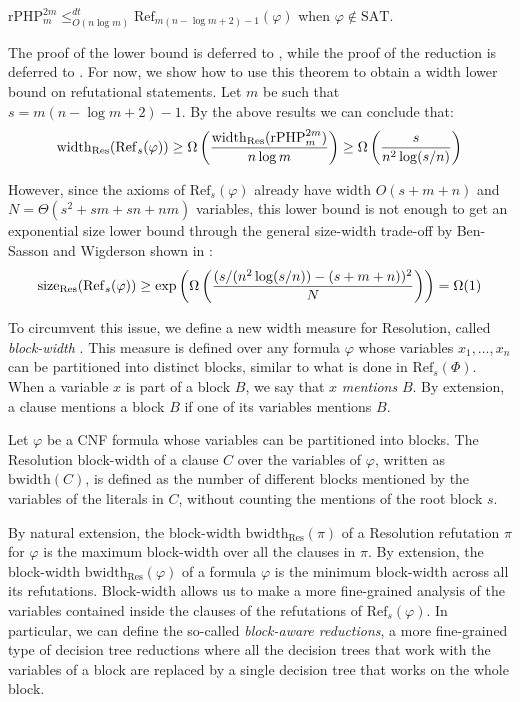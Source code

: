 \begin{theorem}
    \label{thm:rPHP_to_Ref}
    $\mathrm{rPHP}^{2m}_{m} \leq^{dt}_{O(n\log m)} \mathrm{Ref}_{m(n-\log m +2)-1}(\varphi)$ when $\varphi \notin \mathrm{SAT}$.
\end{theorem}

The proof of the lower bound is deferred to , while the proof of the reduction is deferred to . For now, we show how to use this theorem to obtain a width lower bound on refutational statements. Let $m$ be such that $s = m(n-\log m +2)-1$. By the above results we can conclude that:
\begin{equation}
    \mathrm{width}_{\mathrm{Res}}(\mathrm{Ref}_s(\varphi)) \geq \Omega \left ( \dfrac{\mathrm{width}_{\mathrm{Res}}(\mathrm{rPHP}^{2m}_{m})}{n \log m} \right ) \geq \Omega \left ( \frac{s}{n^2\log(s/n)} \right )
\end{equation}

However, since the axioms of $\mathrm{Ref}_s(\varphi)$ already have width $O(s+m+n)$ and $N = \Theta(s^2 + sm + sn + nm)$ variables, this lower bound is not enough to get an exponential size lower bound through the general size-width trade-off by Ben-Sasson and Wigderson shown in :
\begin{equation}
    \mathrm{size}_{\mathrm{Res}}(\mathrm{Ref}_s(\varphi)) \geq \exp\left ( \Omega\left ( \frac{(s/(n^2\log(s/n)) - (s+m+n))^2}{N} \right ) \right ) = \Omega(1)
\end{equation}

To circumvent this issue, we define a new width measure for Resolution, called \textit{block-width} \cite{res_nphard,alg_nphard,pap}. This measure is defined over any formula $\varphi$ whose variables $x_1, \ldots, x_n$ can be partitioned into distinct blocks, similar to what is done in $\mathrm{Ref}_s(\Phi)$. When a variable $x$ is part of a block $B$, we say that $x$ \textit{mentions} $B$. By extension, a clause mentions a block $B$ if one of its variables mentions $B$.

\begin{definition}
    Let $\varphi$ be a CNF formula whose variables can be partitioned into blocks. The Resolution block-width of a clause $C$ over the variables of $\varphi$, written as $\mathrm{bwidth}(C)$, is defined as the number of different blocks mentioned by the variables of the literals in $C$, without counting the mentions of the root block $s$.
\end{definition}

By natural extension, the block-width $\mathrm{bwidth}_{\mathrm{Res}}(\pi)$ of a Resolution refutation $\pi$ for $\varphi$ is the maximum block-width over all the clauses in $\pi$. By extension, the block-width $\mathrm{bwidth}_{\mathrm{Res}}(\varphi)$ of a formula $\varphi$ is the minimum block-width across all its refutations. Block-width allows us to make a more fine-grained analysis of the variables contained inside the clauses of the refutations of $\mathrm{Ref}_s(\varphi)$. In particular, we can define the so-called \textit{block-aware reductions}, a more fine-grained type of decision tree reductions where all the decision trees that work with the variables of a block are replaced by a single decision tree that works on the whole block.

